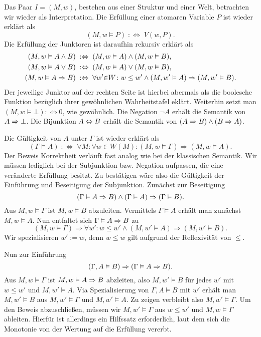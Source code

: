 Das Paar $I=(M,w)$, bestehen aus einer Struktur und einer Welt, betrachten
wir wieder als Interpretation. Die Erfüllung einer atomaren Variable $P$
ist wieder erklärt als
\[(M,w\models P)\;:\Leftrightarrow\; V(w,P).\]
Die Erfüllung der Junktoren ist daraufhin rekursiv erklärt als
\begin{align*}
(M,w\vDash A\land B) &\;:\Leftrightarrow\; (M,w\vDash A)\land (M,w\vDash B),\\
(M,w\vDash A\lor B) &\;:\Leftrightarrow\; (M,w\vDash A)\lor (M,w\vDash B),\\
(M,w\vDash A\Rightarrow B) &\;:\Leftrightarrow\;
  \forall w'{\in}W\colon w\le w'\land (M,w'\vDash A)\Rightarrow (M,w'\vDash B).
\end{align*}
Der jeweilige Junktor auf der rechten Seite ist hierbei abermals
als die boolesche Funktion bezüglich ihrer gewöhnlichen Wahrheitstafel
eklärt. Weiterhin setzt man $(M,w\models\bot) :\Leftrightarrow 0$, wie
gewöhnlich. Die Negation $\lnot A$ erhält die Semantik von
$A\Rightarrow\bot$. Die Bijunktion $A\Leftrightarrow B$ erhält die Semantik
von $(A\Rightarrow B)\land (B\Rightarrow A)$.

Die Gültigkeit von $A$ unter $\Gamma$ ist wieder erklärt als
\[(\Gamma\models A)\;:\Leftrightarrow\; \forall M\colon\forall w\in W(M)\colon
(M,w\models \Gamma)\Rightarrow (M,w\models A).\]
Der Beweis Korrektheit verläuft fast analog wie bei der klassischen
Semantik. Wir müssen lediglich bei der Subjunktion bzw. Negation aufpassen,
die eine veränderte Erfüllung besitzt. Zu bestätigen wäre also die Gültigkeit der
Einführung und Beseitigung der Subjunktion. Zunächst zur Beseitigung
\[(\Gamma\vDash A\Rightarrow B)\land (\Gamma\vDash A)\Rightarrow (\Gamma\vDash B).\]
Aus $M,w\models\Gamma$ ist $M,w\models B$ abzuleiten. Vermittels
$\Gamma\models A$ erhält man zunächst $M,w\models A$. Nun entfaltet sich
$\Gamma\vDash A\Rightarrow B$ zu
\[(M,w\models\Gamma)\Rightarrow\forall w'\colon w\le w'\land
(M,w'\models A)\Rightarrow (M,w'\models B).\]
Wir spezialisieren $w':=w$, denn $w\le w$ gilt aufgrund der Reflexivität
von $\le$.

Nun zur Einführung
\[(\Gamma, A\vDash B)\Rightarrow (\Gamma\vDash A\Rightarrow B).\]
Aus $M,w\models\Gamma$ ist $M,w\vDash A\Rightarrow B$ abzleiten, also
$M,w'\models B$ für jedes $w'$ mit $w\le w'$ und $M,w'\models A$.
Via Spezialisierung von $\Gamma,A\models B$ mit $w'$ erhält man
$M,w'\models B$ aus $M,w'\models\Gamma$ und $M,w'\models A$. Zu zeigen
verbleibt also $M,w'\models\Gamma$. Um den Beweis abzuschließen,
müssen wir $M,w'\models\Gamma$ aus $w\le w'$ und $M,w\models\Gamma$
ableiten. Hierfür ist allerdings ein Hilfssatz erforderlich, laut dem
sich die Monotonie von der Wertung auf die Erfüllung vererbt.

